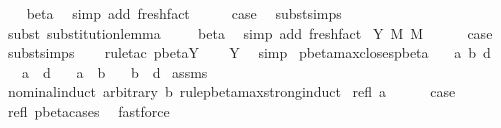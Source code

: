 \begin{isabellebody}
\ \ \isamarkupfalse%
\ beta\ \isamarkupfalse%
\ {\isacharparenleft}simp\ add{\isacharcolon}\ fresh{\isacharunderscore}fact{\isacharparenright}{\isacharplus}\isanewline
\isanewline
\ \ \isamarkupfalse%
\ \isamarkupfalse%
\ {\isacharquery}case\ \isamarkupfalse%
\ subst{\isachardot}simps\isanewline
\ \ \isamarkupfalse%
\ {\isacharparenleft}subst\ substitution{\isacharunderscore}lemma{\isacharparenright}\ \isanewline
\ \ \isamarkupfalse%
\ beta\ \isamarkupfalse%
\ {\isacharparenleft}simp\ add{\isacharcolon}\ fresh{\isacharunderscore}fact{\isacharparenright}{\isacharplus}\isanewline
{}\isamarkupfalse%
\isanewline
{}\isamarkupfalse%
\ {\isacharparenleft}Y\ M\ M{\isacharprime}\ {\isasymsigma}{\isacharparenright}\ \isanewline
\ \ \isamarkupfalse%
\ {\isacharquery}case\ \isamarkupfalse%
\ subst{\isachardot}simps\isanewline
\ \ \isamarkupfalse%
\ {\isacharparenleft}rule{\isacharunderscore}tac\ pbeta{\isachardot}Y{\isacharparenright}\isanewline
\ \ \isamarkupfalse%
\ Y\ \isamarkupfalse%
\ simp\isanewline
{}\isamarkupfalse%
%
\endisatagproof
{\isafoldproof}%
%
\isadelimproof
\isanewline
%
\endisadelimproof
\isanewline
{}\isamarkupfalse%
\ pbeta{\isacharunderscore}max{\isacharunderscore}closes{\isacharunderscore}pbeta{\isacharcolon}\isanewline
\ \ \ a\ b\ d\isanewline
\ \ \ {\isachardoublequoteopen}a\ {\isachargreater}{\isachargreater}{\isachargreater}\ d{\isachardoublequoteclose}\isanewline
\ \ \ {\isachardoublequoteopen}a\ {\isasymggreater}\ b{\isachardoublequoteclose}\isanewline
\ \ \ {\isachardoublequoteopen}b\ {\isasymggreater}\ d{\isachardoublequoteclose}\isanewline
%
\isadelimproof
%
\endisadelimproof
%
\isatagproof
{}\isamarkupfalse%
\ assms\ \isamarkupfalse%
\ {\isacharparenleft}nominal{\isacharunderscore}induct\ arbitrary{\isacharcolon}\ b\ rule{\isacharcolon}pbeta{\isacharunderscore}max{\isachardot}strong{\isacharunderscore}induct{\isacharparenright}\isanewline
{}\isamarkupfalse%
\ {\isacharparenleft}refl\ a{\isacharparenright}\ \ \isanewline
\ \ \isamarkupfalse%
\ {\isacharquery}case\ \isamarkupfalse%
\ refl\ pbeta{\isachardot}cases\ \isamarkupfalse%
\ fastforce\isanewline
{}\isamarkupfalse%

\end{isabellebody}
